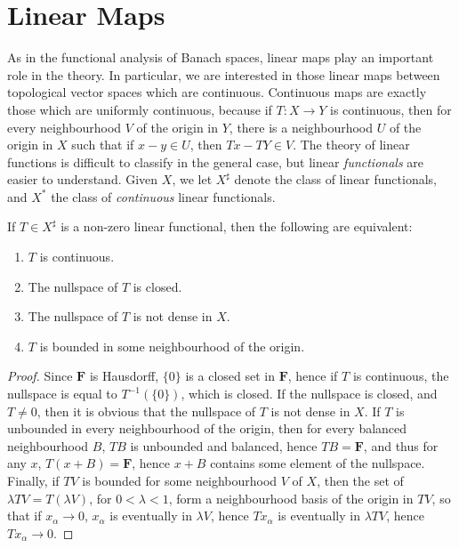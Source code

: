 \section{Linear Maps}

As in the functional analysis of Banach spaces, linear maps play an important role in the theory. In particular, we are interested in those linear maps between topological vector spaces which are continuous. Continuous maps are exactly those which are uniformly continuous, because if $T: X \to Y$ is continuous, then for every neighbourhood $V$ of the origin in $Y$, there is a neighbourhood $U$ of the origin in $X$ such that if $x - y \in U$, then $Tx - TY \in V$. The theory of linear functions is difficult to classify in the general case, but linear {\it functionals} are easier to understand. Given $X$, we let $X^\sharp$ denote the class of linear functionals, and $X^*$ the class of {\it continuous} linear functionals.

\begin{theorem}
    If $T \in X^\sharp$ is a non-zero linear functional, then the following are equivalent:
    \begin{enumerate}
        \item $T$ is continuous.
        \item The nullspace of $T$ is closed.
        \item The nullspace of $T$ is not dense in $X$.
        \item $T$ is bounded in some neighbourhood of the origin.
    \end{enumerate}
\end{theorem}
\begin{proof}
    Since $\mathbf{F}$ is Hausdorff, $\{ 0 \}$ is a closed set in $\mathbf{F}$, hence if $T$ is continuous, the nullspace is equal to $T^{-1}(\{ 0 \})$, which is closed. If the nullspace is closed, and $T \neq 0$, then it is obvious that the nullspace of $T$ is not dense in $X$. If $T$ is unbounded in every neighbourhood of the origin, then for every balanced neighbourhood $B$, $TB$ is unbounded and balanced, hence $TB = \mathbf{F}$, and thus for any $x$, $T(x + B) = \mathbf{F}$, hence $x + B$ contains some element of the nullspace. Finally, if $TV$ is bounded for some neighbourhood $V$ of $X$, then the set of $\lambda TV = T(\lambda V)$, for $0 < \lambda < 1$, form a neighbourhood basis of the origin in $TV$, so that if $x_\alpha \to 0$, $x_\alpha$ is eventually in $\lambda V$, hence $Tx_\alpha$ is eventually in $\lambda TV$, hence $Tx_\alpha \to 0$.
\end{proof}

